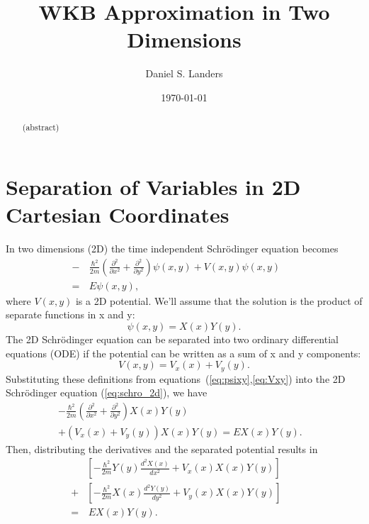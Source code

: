 \documentclass[aps,twocolumn,secnumarabic,nobalancelastpage,amsmath,amssymb,
nofootinbib]{revtex4}
\begin{document}
\title{WKB Approximation in Two Dimensions}
\author         {Daniel S. Landers}
\date{\today}

\begin{abstract}
(abstract)
\end{abstract}

\maketitle
\section{Separation of Variables in 2D Cartesian Coordinates}
In two dimensions (2D) the time independent Schr\"odinger equation becomes
\begin{align}
\nonumber
-&\,\frac{\hbar^2}{2m}
\left( \frac{\partial^2}{\partial x^2} + \frac{\partial^2}{\partial y^2}\right)
\psi(x,y) + V(x,y)\psi(x,y)&&\\ = &\,E\psi(x,y),&&
\label{eq:schro_2d}
\end{align}
%
where $V(x,y)$ is a 2D potential. We'll assume that the solution is the
product of separate functions in x and y:
\begin{equation}
\psi(x,y) = X(x)Y(y).
\label{eq:psixy}
\end{equation}
%
The 2D Schr\"odinger equation can be separated into two ordinary differential
equations (ODE) if the potential can be written as a sum of x and y
components:
\begin{equation}
V(x,y) = V_x(x) + V_y(y).
\label{eq:Vxy}
\end{equation}
%
Substituting these definitions from equations~(\ref{eq:psixy},\ref{eq:Vxy})
into the 2D Schr\"odinger equation (\ref{eq:schro_2d}), we have
\begin{align}
\nonumber
&-\frac{\hbar^2}{2m}
\left( \frac{\partial^2}{\partial x^2}
+ \frac{\partial^2}{\partial y^2}\right)X(x)Y(y)&&\\
&+ \left(V_x(x) + V_y(y)\right)X(x)Y(y) = EX(x)Y(y).&&
\label{eq:schro_1}
\end{align}
%
Then, distributing the derivatives and the separated potential results in
\begin{align}
\nonumber
&\left[-\frac{\hbar^2}{2m}Y(y)\frac{d^2X(x)}{dx^2}+V_x(x)X(x)Y(y)\right]&&\\
\nonumber
+ &\left[-\frac{\hbar^2}{2m}X(x)\frac{d^2Y(y)}{dy^2}+V_y(x)X(x)Y(y)\right]&&\\
= & \,EX(x)Y(y).&&
\label{eq:schro_2}
\end{align}
\end{document}

